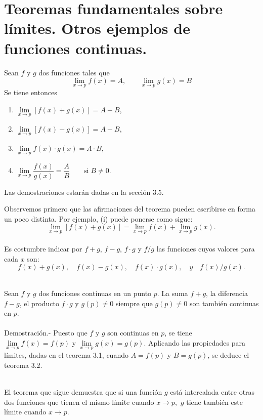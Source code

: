 \section{Teoremas fundamentales sobre límites. Otros ejemplos de funciones continuas.}

    \begin{teo}
	Sean $f$ y $g$ dos funciones tales que 
	$$\lim_{x\to p} f(x)=A,\qquad \lim_{x\to p}g(x)=B$$
	Se tiene entonces
	\begin{enumerate}[\bfseries (i)]
	    \item $\lim\limits_{x\to p} [f(x)+g(x)]=A+B$,
	    \item $\lim\limits_{x\to p} [f(x)-g(x)]=A-B$,
	    \item $\lim\limits_{x\to p} f(x)\cdot g(x) = A\cdot B$,
	    \item $\lim\limits_{x\to p} \dfrac{f(x)}{g(x)} = \dfrac{A}{B}\qquad \mbox{si}\; B\neq 0$.\\
	\end{enumerate}
	Las demostraciones estarán dadas en la sección 3.5.
    \end{teo}


Observemos primero que las afirmaciones del teorema pueden escribirse en forma un poco distinta. Por ejemplo, (i) puede ponerse como sigue:
$$\lim_{x\to p}[f(x)+g(x)]=\lim_{x\to p}f(x) + \lim_{x\to p}g(x).$$\\
Es costumbre indicar por $f+g$, $f-g$, $f\cdot g$ y $f/g$ las funciones cuyos valores para cada $x$ son:
$$f(x)+g(x),\quad f(x)-g(x),\quad f(x)\cdot g(x),\quad y \quad f(x)/g(x).$$\\

\begin{teo}
    Sean $f$ y $g$ dos funciones continuas en un punto $p$. La suma $f+g$, la diferencia $f-g$,  el producto $f\cdot g$ y  $g(p)\neq 0$ siempre que $g(p)\neq 0$ son también continuas en $p$.\\\\
    Demostración.-\; Puesto que $f$ y $g$ son continuas en $p$, se tiene $\lim\limits_{x\to p} f(x)=f(p)$ y $\lim\limits_{x\to p}g(x)=g(p)$. Aplicando las propiedades para límites, dadas en el teorema 3.1, cuando $A=f(p)$ y $B=g(p)$, se deduce el teorema 3.2.\\\\
\end{teo}

El teorema que sigue demuestra que si una función $g$ está intercalada entre otras dos funciones que tienen el mismo límite cuando $x\to p,$ $g$ tiene también este límite cuando $x\to p.$\\\\

